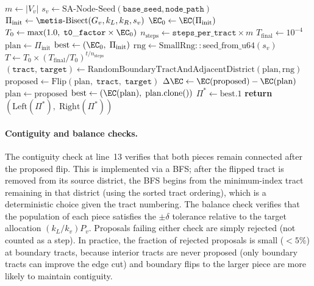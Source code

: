 \begin{algorithm}[t]
\caption{\sa{}-\textsc{Bisect}($G_v$, $k_L$, $k_R$, $\mathtt{base\_seed}$,
  $\mathtt{node\_path}$, $\mathtt{steps\_per\_tract}$, $\mathtt{t0\_factor}$)}
\label{alg:sa}
\begin{algorithmic}[1]
\State $m \gets |V_v|$
\State $s_v \gets \mathrm{SA\text{-}Node\text{-}Seed}(\mathtt{base\_seed},
       \mathtt{node\_path})$ 
\State $\Pi_{\mathrm{init}} \gets \metis\text{-}\mathrm{Bisect}(G_v, k_L, k_R, s_v)$
\State $\EC_0 \gets \EC(\Pi_{\mathrm{init}})$
\State $T_0 \gets \max(1.0,\; \mathtt{t0\_factor} \times \EC_0)$
\State $n_{\mathrm{steps}} \gets \mathtt{steps\_per\_tract} \times m$
\State $T_{\mathrm{final}} \gets 10^{-4}$
\State $\mathrm{plan} \gets \Pi_{\mathrm{init}}$
\State $\mathrm{best} \gets (\EC_0,\; \Pi_{\mathrm{init}})$
\State $\mathrm{rng} \gets \mathrm{SmallRng::seed\_from\_u64}(s_v)$
  \State $T \gets T_0 \times (T_{\mathrm{final}} / T_0)^{t / n_{\mathrm{steps}}}$
  \State $(\mathtt{tract},\, \mathtt{target}) \gets
         \mathrm{RandomBoundaryTractAndAdjacentDistrict}(\mathrm{plan}, \mathrm{rng})$
  \State $\mathrm{proposed} \gets \mathrm{Flip}(\mathrm{plan},\;
         \mathtt{tract},\; \mathtt{target})$
    \State $\Delta\EC \gets \EC(\mathrm{proposed}) - \EC(\mathrm{plan})$
      \State $\mathrm{plan} \gets \mathrm{proposed}$
        \State $\mathrm{best} \gets (\EC(\mathrm{plan}),\; \mathrm{plan}.\mathrm{clone}())$
      \EndIf
    \EndIf
  \EndIf
\EndFor
\State $\Pi^* \gets \mathrm{best}.1$
\State \textbf{return} $(\mathrm{Left}(\Pi^*),\; \mathrm{Right}(\Pi^*))$
\end{algorithmic}
\end{algorithm}

\paragraph{Contiguity and balance checks.}
The contiguity check at line~13 verifies that both pieces remain connected
after the proposed flip.
This is implemented via a BFS; after the flipped tract is removed from its
source district, the BFS begins from the minimum-index tract remaining in
that district (using the sorted tract ordering), which is a deterministic
choice given the tract numbering.
The balance check verifies that the population of each piece satisfies the
$\pm\delta$ tolerance relative to the target allocation $(k_L / k_v) P_v$.
Proposals failing either check are simply rejected (not counted as a step).
In practice, the fraction of rejected proposals is small ($<5\%$) at
boundary tracts, because interior tracts are never proposed (only boundary
tracts can improve the edge cut) and boundary flips to the larger piece
are more likely to maintain contiguity.

